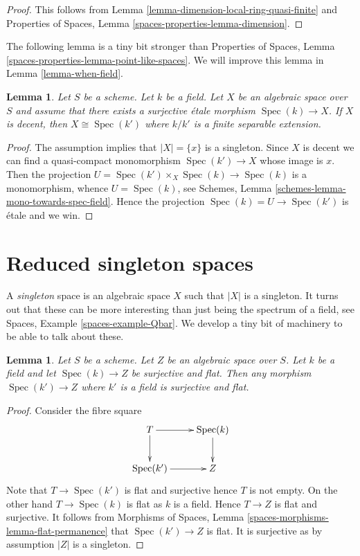 \documentclass{stacks-project}
\theoremstyle{plain}
\newtheorem{lemma}[subsection]{Lemma}
\theoremstyle{definition}
\theoremstyle{remark}
\numberwithin{equation}{subsection}
\def\Spec{\mathop{\mathrm{Spec}}}
\begin{document}
\begin{proof}
This follows from Lemma \ref{lemma-dimension-local-ring-quasi-finite}
and Properties of Spaces, Lemma \ref{spaces-properties-lemma-dimension}.
\end{proof}

\noindent
The following lemma is a tiny bit stronger than
Properties of Spaces,
Lemma \ref{spaces-properties-lemma-point-like-spaces}.
We will improve this lemma in Lemma \ref{lemma-when-field}.

\begin{lemma}
\label{lemma-decent-point-like-spaces}
Let $S$ be a scheme. Let $k$ be a field. Let $X$ be an algebraic space
over $S$ and assume that there exists a surjective \'etale morphism
$\Spec(k) \to X$. If $X$ is decent, then $X \cong \Spec(k')$
where $k/k'$ is a finite separable extension.
\end{lemma}

\begin{proof}
The assumption implies that $|X| = \{x\}$ is a singleton. Since
$X$ is decent we can find a quasi-compact monomorphism $\Spec(k') \to X$
whose image is $x$. Then the projection
$U = \Spec(k') \times_X \Spec(k) \to \Spec(k)$
is a monomorphism, whence $U = \Spec(k)$, see
Schemes, Lemma \ref{schemes-lemma-mono-towards-spec-field}.
Hence the projection $\Spec(k) = U \to \Spec(k')$ is \'etale and
we win.
\end{proof}






\section{Reduced singleton spaces}
\label{section-singleton}

\noindent
A {\it singleton} space is an algebraic space $X$ such that $|X|$ is
a singleton. It turns out that these can be more interesting than
just being the spectrum of a field, see
Spaces, Example \ref{spaces-example-Qbar}.
We develop a tiny bit of machinery to be able to talk about these.

\begin{lemma}
\label{lemma-flat-cover-by-field}
Let $S$ be a scheme. Let $Z$ be an algebraic space over $S$.
Let $k$ be a field and let $\Spec(k) \to Z$ be surjective and flat.
Then any morphism $\Spec(k') \to Z$ where $k'$ is a field is
surjective and flat.
\end{lemma}

\begin{proof}
Consider the fibre square
$$
\xymatrix{
T \ar[d] \ar[r] & \Spec(k) \ar[d] \\
\Spec(k') \ar[r] & Z
}
$$
Note that $T \to \Spec(k')$ is flat and surjective hence $T$
is not empty. On the other hand $T \to \Spec(k)$ is flat as
$k$ is a field. Hence $T \to Z$ is flat and surjective.
It follows from
Morphisms of Spaces, Lemma \ref{spaces-morphisms-lemma-flat-permanence}
that $\Spec(k') \to Z$ is flat. It is surjective as by assumption
$|Z|$ is a singleton.
\end{proof}
\end{document}
